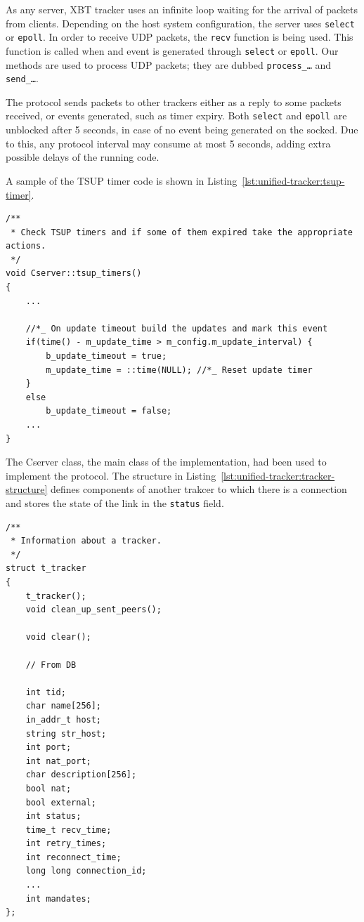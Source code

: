 As any server, XBT tracker uses an infinite loop waiting for the arrival of
packets from clients. Depending on the host system configuration, the server
uses \texttt{select} or \texttt{epoll}. In order to receive UDP packets, the
\texttt{recv} function is being used. This function is called when and event
is generated through \texttt{select} or \texttt{epoll}. Our methods are used
to process UDP packets; they are dubbed \texttt{process\_\ldots} and
\texttt{send\_\ldots}.

The protocol sends packets to other trackers either as a reply to some packets
received, or events generated, such as timer expiry. Both \texttt{select} and
\texttt{epoll} are unblocked after 5 seconds, in case of no event being
generated on the socked. Due to this, any protocol interval may consume at
most 5 seconds, adding extra possible delays of the running code.

A sample of the TSUP timer code is shown in
Listing~\ref{lst:unified-tracker:tsup-timer}.

\lstset{language=C,caption=TSUP
Timer,label=lst:unified-tracker:tsup-timer}
\begin{lstlisting}
/**
 * Check TSUP timers and if some of them expired take the appropriate actions.
 */
void Cserver::tsup_timers()
{
    ...

    //*_ On update timeout build the updates and mark this event
    if(time() - m_update_time > m_config.m_update_interval) {
        b_update_timeout = true;
        m_update_time = ::time(NULL); //*_ Reset update timer
    }
    else
        b_update_timeout = false;
    ...
}
\end{lstlisting}

The Cserver class, the main class of the implementation, had been used to
implement the protocol. The structure in
Listing~\ref{lst:unified-tracker:tracker-structure} defines components of
another trakcer to which there is a connection and stores the state of the
link in the \texttt{status} field.

\lstset{language=C,caption=Tracker Structure,label=lst:unified-tracker:tracker-structure}
\begin{lstlisting}
/**
 * Information about a tracker.
 */
struct t_tracker
{
    t_tracker();
    void clean_up_sent_peers();

    void clear();

    // From DB

    int tid;
    char name[256];
    in_addr_t host;
    string str_host;
    int port;
    int nat_port;
    char description[256];
    bool nat;
    bool external;
    int status;
    time_t recv_time;
    int retry_times;
    int reconnect_time;
    long long connection_id;
    ...
    int mandates;
};
\end{lstlisting}

